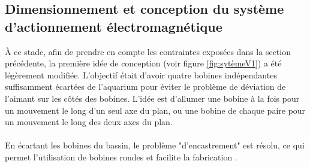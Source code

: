 \documentclass{article}
\begin{document}
\subsection{Dimensionnement et conception du système d'actionnement électromagnétique}
À ce stade, afin de prendre en compte les contraintes exposées dans la section précédente, la première idée de conception (voir figure \ref{fig:sytèmeV1}) a été légèrement modifiée. L'objectif était d'avoir quatre bobines indépendantes suffisamment écartées de l'aquarium pour éviter le problème de déviation de l'aimant sur les côtés des bobines. L'idée est d'allumer une bobine à la fois pour un mouvement le long d'un seul axe du plan, ou une bobine de chaque paire pour un mouvement le long des deux axes du plan.\\\\
En écartant les bobines du bassin, le problème "d'encastrement" est résolu, ce qui permet l'utilisation de bobines rondes et facilite la fabrication .
\end{document}

